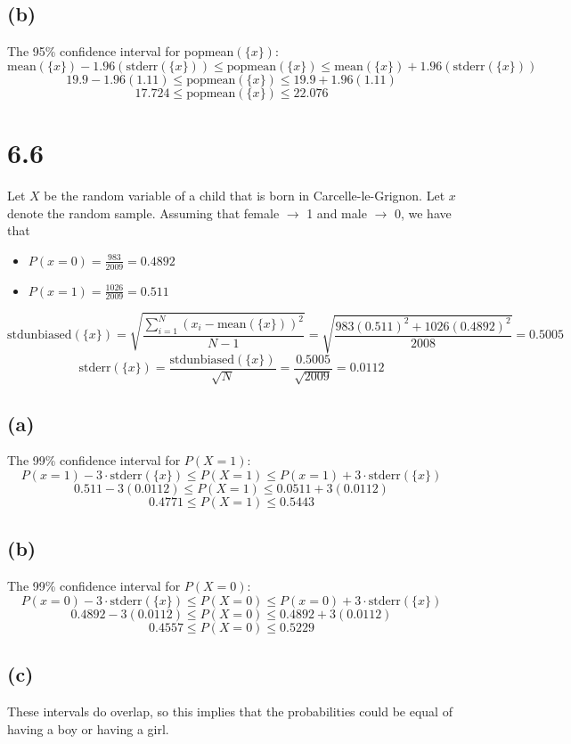 \documentclass[11pt]{article}
\begin{document}
\subsection*{(b)}
The 95\% confidence interval for popmean$(\{x\})$:
\[\text{mean}(\{x\})-1.96(\text{stderr}(\{x\}))\leq\text{popmean}(\{x\})\leq\text{mean}(\{x\})+1.96(\text{stderr}(\{x\}))\]
\[19.9-1.96(1.11)\leq\text{popmean}(\{x\})\leq19.9+1.96(1.11)\]
\[17.724\leq\text{popmean}(\{x\})\leq22.076\]
\section*{6.6}
Let $X$ be the random variable of a child that is born in Carcelle-le-Grignon. Let $x$ denote the random sample. Assuming that female $\rightarrow$ 1 and male $\rightarrow$ 0, we have that 
\begin{itemize}
	\item $P(x=0)=\frac{983}{2009}=0.4892$
	\item $P(x=1)=\frac{1026}{2009}=0.511$
\end{itemize}
\[\text{stdunbiased}(\{x\})=\sqrt{\frac{\sum_{i=1}^N(x_i-\text{mean}(\{x\}))^2}{N-1}}=\sqrt{\frac{983(0.511)^2+1026(0.4892)^2}{2008}}=0.5005\]
\[\text{stderr}(\{x\})=\frac{\text{stdunbiased}(\{x\})}{\sqrt{N}}=\frac{0.5005}{\sqrt{2009}}=0.0112\]
\subsection*{(a)}
The 99\% confidence interval for $P(X=1)$:
\[P(x=1)-3\cdot\text{stderr}(\{x\})\leq P(X=1)\leq P(x=1)+3\cdot\text{stderr}(\{x\})\]
\[0.511-3(0.0112)\leq P(X=1)\leq 0.0511+3(0.0112)\]
\[0.4771\leq P(X=1)\leq 0.5443\]
\subsection*{(b)}
The 99\% confidence interval for $P(X=0)$:
\[P(x=0)-3\cdot\text{stderr}(\{x\})\leq P(X=0)\leq P(x=0)+3\cdot\text{stderr}(\{x\})\]
\[0.4892-3(0.0112)\leq P(X=0)\leq 0.4892+3(0.0112)\]
\[0.4557\leq P(X=0)\leq 0.5229\]
\subsection*{(c)}
These intervals do overlap, so this implies that the probabilities could be equal of having a boy or having a girl.
\end{document}
